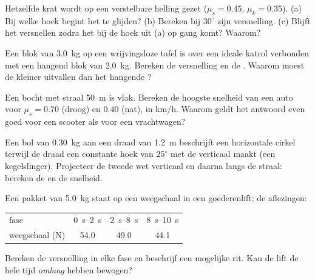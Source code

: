 \begin{exercise}[$\star\star$]\label{exo:g12:newtons-laws:7}
Hetzelfde krat wordt op een verstelbare helling gezet ($\mu_s = 0.45$,
$\mu_k = 0.35$). (a) Bij welke hoek begint het te glijden? (b) Bereken bij
$30^\circ$ zijn versnelling. (c) Blijft het versnellen zodra het bij de hoek uit (a)
op gang komt? Waarom?
\end{exercise}

\begin{exercise}[$\star\star$]\label{exo:g12:newtons-laws:8}
Een blok van \qty{3.0}{kg} op een wrijvingsloze tafel is over een ideale katrol
verbonden met een hangend blok van \qty{2.0}{kg}. Bereken de versnelling en de
. Waarom moest de  kleiner uitvallen dan het hangende ?
\end{exercise}

\begin{exercise}[$\star\star$]\label{exo:g12:newtons-laws:9}
Een bocht met straal \qty{50}{m} is vlak. Bereken de hoogste snelheid van een auto
voor $\mu_s = 0.70$ (droog) en $0.40$ (nat), in \unit{km/h}. Waarom geldt het
antwoord even goed voor een scooter als voor een vrachtwagen?
\end{exercise}

\begin{exercise}[$\star\star$]\label{exo:g12:newtons-laws:10}
Een bol van \qty{0.30}{kg} aan een draad van \qty{1.2}{m} beschrijft een horizontale
cirkel terwijl de draad een constante hoek van $25^\circ$ met de verticaal maakt (een
kegelslinger). Projecteer de tweede wet verticaal en daarna langs de straal: bereken
de  en de snelheid.
\end{exercise}

\begin{exercise}[$\star\star$]\label{exo:g12:newtons-laws:11}
Een pakket van \qty{5.0}{kg} staat op een weegschaal in een goederenlift; de
aflezingen:
\begin{center}\small\begin{tabular}{lccc}
fase & \qtyrange{0}{2}{s} & \qtyrange{2}{8}{s} & \qtyrange{8}{10}{s}\\
weegschaal (\unit{N}) & 54.0 & 49.0 & 44.1
\end{tabular}\end{center}
Bereken de versnelling in elke fase en beschrijf een mogelijke rit. Kan de lift de
hele tijd \emph{omlaag} hebben bewogen?
\end{exercise}

